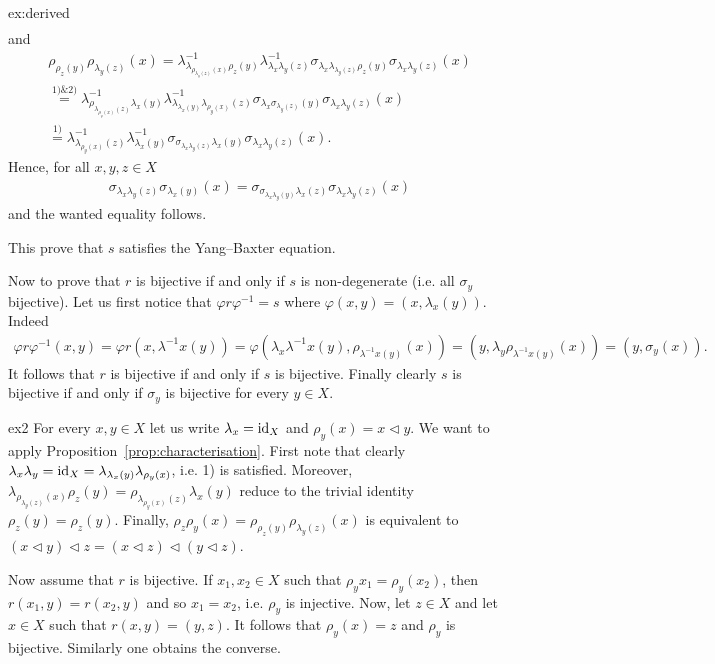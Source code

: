 \begin{sol}{ex:derived}
\begin{align*}
    \end{align*}
    and
    \begin{align*}
        \rho_{\rho_z(y)}\rho_{\lambda_y(z)}(x) = 
        \lambda^{-1}_{\lambda_{\rho_{\lambda_y(z)}(x)}\rho_z(y)}\lambda^{-1}_{\lambda_x\lambda_y(z)}\sigma_{\lambda_x\lambda_{\lambda_y(z)}\rho_z(y)}\sigma_{\lambda_x\lambda_y(z)}(x)\\
        \overset{1)\&2)}{=}\lambda^{-1}_{\rho_{\lambda_{\rho_y(x)}(z)}\lambda_x(y)}\lambda^{-1}_{\lambda_{\lambda_x(y)}\lambda_{\rho_y(x)}(z)}\sigma_{\lambda_x\sigma_{\lambda_y(z)}(y)}\sigma_{\lambda_x\lambda_y(z)}(x)\\
        \overset{1)}{=}\lambda^{-1}_{\lambda_{\rho_y(x)}(z)}\lambda^{-1}_{\lambda_x(y)}\sigma_{\sigma_{\lambda_x\lambda_y(z)}\lambda_x(y)}\sigma_{\lambda_x\lambda_y(z)}(x).
    \end{align*}
    Hence, for all $x,y,z\in X$
    \begin{align*}
        \sigma_{\lambda_x\lambda_y(z)}\sigma_{\lambda_x(y)}(x)=\sigma_{\sigma_{\lambda_x\lambda_y(y)}\lambda_x(z)}\sigma_{\lambda_x\lambda_y(z)}(x)
    \end{align*}
    and the wanted equality follows.

    This prove that $s$ satisfies the Yang--Baxter equation.

    Now to prove that $r$ is bijective if and only if $s$ is non-degenerate (i.e. all $\sigma_y$ bijective). Let us first notice that $\varphi r\varphi^{-1} = s$ where $\varphi(x,y)=(x,\lambda_x(y))$. Indeed
    \begin{align*}
        \varphi r \varphi^{-1}(x,y) = \varphi r (x, \lambda^{-1}x(y))
        =\varphi(\lambda_x\lambda^{-1}x(y), \rho_{\lambda^{-1}x(y)}(x))
        =(y, \lambda_y\rho_{\lambda^{-1}x(y)}(x)) = (y,\sigma_y(x)).
    \end{align*}
    It follows that $r$ is bijective if and only if $s$ is bijective. Finally clearly $s$ is bijective if and only if $\sigma_y$ is bijective for every $y\in X$. 
\end{sol}

\begin{sol}{ex2}
    For every $x,y \in X$ let us write $\lambda_x = \operatorname{id}_X$ and $\rho_y(x)=x \triangleleft y$.
    We want to apply Proposition~\ref{prop:characterisation}.
    First note that clearly $\lambda_x\lambda_y =\operatorname{id}_X = \lambda_{\lambda_x(y)}\lambda_{\rho_y(x)}$, i.e. 1) is satisfied. 
    Moreover,$\lambda_{\rho_{\lambda_y(z)}(x)}\rho_z(y)=\rho_{\lambda_{\rho_y(x)}(z)}\lambda_x(y)$ reduce to the trivial identity $\rho_z(y)=\rho_{z}(y)$.
    Finally,  $\rho_z\rho_y(x)=\rho_{\rho_z(y)}\rho_{\lambda_y(z)}(x)$ is equivalent to $(x\triangleleft y)\triangleleft z=(x\triangleleft z)\triangleleft(y\triangleleft z)$.

    Now assume that $r$ is bijective. If $x_1,x_2\in X$ such that $\rho_y{x_1}=\rho_y(x_2)$, then $r(x_1,y)=r(x_2,y)$ and so $x_1=x_2$, i.e. $\rho_y$ is injective. Now, let $z \in X$ and let $x\in X$ such that $r(x,y) =(y,z)$. It follows that $\rho_y(x)=z$ and $\rho_y$ is bijective. 
    Similarly one obtains the converse. 
\end{sol}




